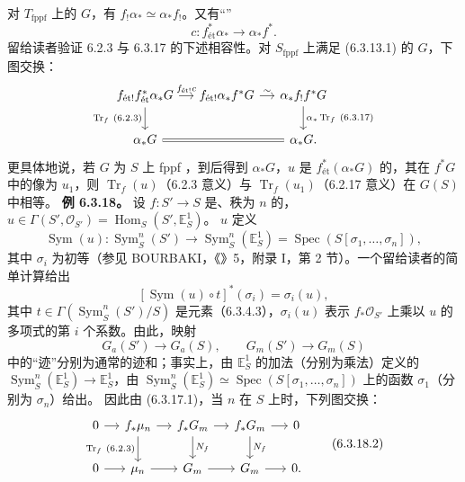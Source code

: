 对 $T_{\mathrm{fppf}}$ 上的 $G$，有 $f_!\alpha_*\simeq\alpha_*f_!$。又有“”
\[c:f_{\text{ét}}^*\alpha_*\longrightarrow\alpha_*f^*.\]
留给读者验证 6.2.3 与 6.3.17 的下述相容性。对 $S_{\mathrm{fppf}}$ 上满足 (6.3.13.1) 的 $G$，下图交换：
\[\begin{tikzcd}[column sep=small]
f_{\text{ét}!}f_{\text{ét}}^*\alpha_*G\arrow[r,"f_{\text{ét}!}c"]\arrow[d,"\operatorname{Tr}_f\ (6.2.3)"']&f_{\text{ét}!}\alpha_*f^*G\arrow[r,"\sim"]&\alpha_*f_!f^*G\arrow[d,"\alpha_*\operatorname{Tr}_f\ (6.3.17)"]\\\alpha_*G\arrow[rr,equal]&&\alpha_*G.
\end{tikzcd}\]
更具体地说，若 $G$ 为 $S$ 上 fppf ，到后得到 $\alpha_*G$，$u$ 是 $f_{\text{ét}}^*(\alpha_*G)$ 的，其在 $f^*G$ 中的像为 $u_1$，则 $\operatorname{Tr}_f(u)$（6.2.3 意义）与 $\operatorname{Tr}_f(u_1)$（6.2.17 意义）在 $G(S)$ 中相等。
\textbf{例 6.3.18。} 设 $f:S'\to S$ 是、秩为 $n$ 的，$u\in\Gamma(S',\mathcal O_{S'})=\operatorname{Hom}_S(S',\mathbb E_S^1)$。 $u$ 定义
\[\operatorname{Sym}(u):\operatorname{Sym}_S^n(S')\longrightarrow\operatorname{Sym}_S^n(\mathbb E_S^1)=\operatorname{Spec}(S[\sigma_1,\ldots,\sigma_n]),\]
其中 $\sigma_i$ 为初等（参见 BOURBAKI，《》5，附录 I，第 2 节）。一个留给读者的简单计算给出
\[[\operatorname{Sym}(u)\circ t]^*(\sigma_i)=\sigma_i(u),\tag{6.3.18.1}\]
其中 $t\in\Gamma(\operatorname{Sym}_S^n(S')/S)$ 是元素（6.3.4.3），$\sigma_i(u)$ 表示 $f_*\mathcal O_{S'}$ 上乘以 $u$ 的多项式的第 $i$ 个系数。由此，映射
\[G_a(S')\longrightarrow G_a(S),\qquad G_m(S')\longrightarrow G_m(S)\]
中的“迹”分别为通常的迹和；事实上，由 $\mathbb E_S^1$ 的加法（分别为乘法）定义的 $\operatorname{Sym}_S^n(\mathbb E_S^1)\to\mathbb E_S^1$，由 $\operatorname{Sym}_S^n(\mathbb E_S^1)\simeq\operatorname{Spec}(S[\sigma_1,\ldots,\sigma_n])$ 上的函数 $\sigma_1$（分别为 $\sigma_n$）给出。
因此由 (6.3.17.1)，当 $n$ 在 $S$ 上时，下列图交换：
\[\begin{tikzcd}[column sep=small]0\arrow[r]&f_*\mu_n\arrow[r]\arrow[d,"\operatorname{Tr}_f\ (6.2.3)"']&f_*G_m\arrow[r]\arrow[d,"N_f"]&f_*G_m\arrow[r]\arrow[d,"N_f"]&0\\0\arrow[r]&\mu_n\arrow[r]&G_m\arrow[r]&G_m\arrow[r]&0.\end{tikzcd}\tag{6.3.18.2}\]
